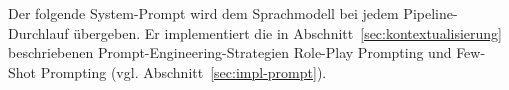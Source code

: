 \clearpage


\clearpage

\label{app:systemprompt}

Der folgende System-Prompt wird dem Sprachmodell bei jedem Pipeline-Durchlauf übergeben. Er implementiert die in Abschnitt~\ref{sec:kontextualisierung} beschriebenen Prompt-Engineering-Strategien Role-Play Prompting und Few-Shot Prompting (vgl. Abschnitt~\ref{sec:impl-prompt}).

